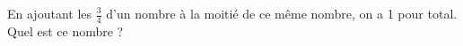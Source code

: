 En ajoutant les $\frac{3}{4}$ d'un nombre à la moitié de ce même nombre, on a 1 pour total. Quel est ce nombre ?